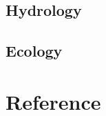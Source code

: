 \documentclass{article}
\begin{document}

\subsection{Hydrology}



\subsection{Ecology}




\newpage
{}
\fancyfoot[C]{}
\thispagestyle{fancy}
\section{Reference}
\end{document}
